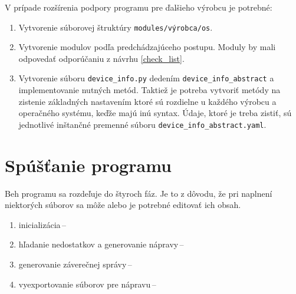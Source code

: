 \vspace{1em}
\noindent
V prípade rozšírenia podpory programu pre ďalšieho výrobcu je potrebné:
\begin{enumerate}
	\item Vytvorenie súborovej štruktúry \texttt{modules/výrobca/os}.
	\item Vytvorenie modulov podľa predchádzajúceho postupu. Moduly by mali odpovedať odporúčaniu z návrhu \ref{check_list}.
	\item Vytvorenie súboru \texttt{device\_info.py} dedením \texttt{device\_info\_abstract} a implementovanie nutných metód. Taktiež je potreba vytvoriť metódy na zistenie základných nastavením ktoré sú rozdielne u každého výrobcu a operačného systému, keďže majú inú syntax. Údaje, ktoré je treba zistiť, sú jednotlivé inštančné premenné súboru \texttt{device\_info\_abstract.yaml}.  
\end{enumerate}

\section{Spúšťanie programu}
Beh programu sa rozdeľuje do štyroch fáz. Je to z dôvodu, že pri naplnení niektorých súborov sa môže alebo je potrebné editovať ich obsah.


\begin{enumerate}
	\item inicializácia\,--\,
	\item hľadanie nedostatkov a generovanie nápravy\,--\,
	\item generovanie záverečnej správy\,--\,
	\item vyexportovanie súborov pre nápravu\,--\,
\end{enumerate}


